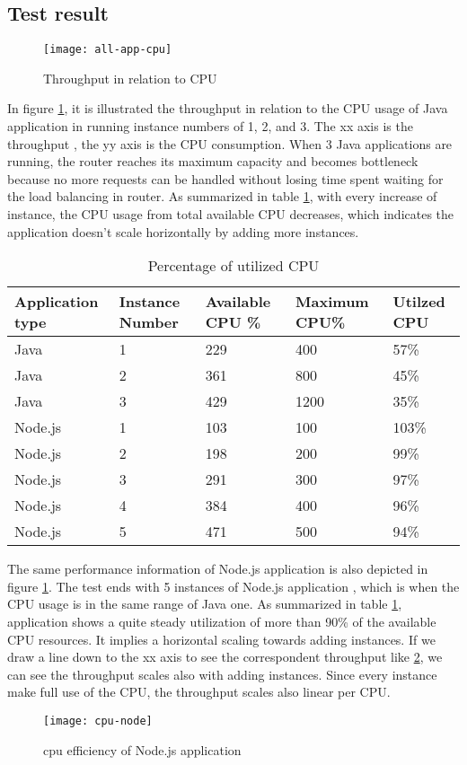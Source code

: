 \subsection{Test result}
 \begin{figure}[h]
	\centering
	\texttt{[image: all-app-cpu]}
	\caption{Throughput in relation to CPU}
	\label{all-app-cpu}
\end{figure}
In figure \ref{all-app-cpu}, it is illustrated the throughput in relation to the CPU usage of Java application in running instance numbers of 1, 2, and 3. The xx axis is the throughput , the yy axis is the CPU consumption. When 3 Java applications are running, the router reaches its maximum capacity and becomes bottleneck because no more requests can be handled without losing time spent waiting for the load balancing in router. As summarized in table \ref{app-cpu-usage}, with every increase of instance, the CPU usage from total available CPU decreases, which indicates the application doesn't scale horizontally by adding more instances. 
\begin{table}[h]
	\caption{Percentage of utilized CPU}
	\label{app-cpu-usage}
	\renewcommand{\arraystretch}{1.2}
	\centering
	\sffamily
	\begin{footnotesize}
		\begin{tabular}{l l l l l  }
			\toprule
			\textbf{Application  type} &\textbf{Instance Number} & \textbf{Available CPU \%} & \textbf{Maximum CPU\%}& \textbf{Utilzed CPU} }\\
		\midrule
		Java &1 	&	229	 & 400 & 57\% \\
		Java &2	&	361 & 800& 45\% \\
		Java &3	&	429  &	1200 & 35\%\\
				\midrule
			Node.js &1 	&	103	 & 100 & 103\% \\
		Node.js &2	&	198 &  200& 99\% \\
		Node.js &3	&	291 & 300 & 97\%\\
		Node.js &4	&	384 & 400 & 96\%\\
		Node.js &5	&	471 & 500 & 94\%\\
		\bottomrule
	\end{tabular}
\end{footnotesize}
\rmfamily
\end{table}

The same performance information of Node.js application is also depicted in figure \ref{all-app-cpu}. The test ends with 5 instances of Node.js application , which is when the CPU usage is in the same range of Java one. As summarized in table \ref{app-cpu-usage}, application shows a quite steady utilization of more than 90\% of the available CPU resources. It implies a horizontal scaling towards adding instances. If we draw a line down to the xx axis to see the correspondent throughput like \ref{cpu-node}, we can see the throughput scales also with adding instances. Since every instance make full use of the CPU, the throughput scales also linear per CPU. \\
 \begin{figure}[h]
	\centering
	\texttt{[image: cpu-node]}
	\caption{cpu efficiency of Node.js application}
	\label{cpu-node}
\end{figure}

